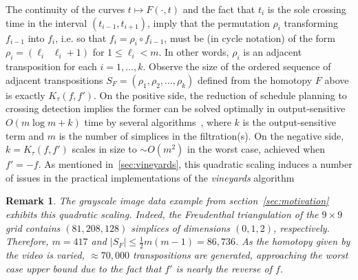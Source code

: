 \documentclass[sn-mathphys]{sn-jnl}
\newtheorem{remark}{Remark}
\begin{document}
The continuity of the curves $t\mapsto F(\cdot, t)$ and the fact that $t_i$ is the sole crossing time  in the interval $(t_{i-1}, t_{i+1})$, imply that the
permutation $\rho_i $   
transforming $f_{i-1}$ into $f_i$, i.e. so that  $f_i = \rho_i \circ f_{i-1}$, must be (in cycle notation) of the form 
$\rho_i = (\ell_i \;\; \ell_i +1 )$ for $1 \leq \ell_i < m$. In other words, $\rho_i$ is an adjacent transposition for each $i =1,\ldots, k$.
Observe the size of the ordered sequence of adjacent transpositions  $S_F = (\rho_1, \rho_2, \ldots, \rho_k)$ defined from the homotopy $F$ above is exactly $K_\tau(f,f')$.
On the positive side, the reduction of schedule planning to crossing detection implies the former can be   solved optimally in output-sensitive $O(m \log m + k)$ time by several algorithms~\cite{boissonnat2000efficient}, where $k$ is the output-sensitive term and $m$ is the number of simplices in the filtration(s).
On  the negative side, $k = K_\tau(f,f')$ scales in size to $\sim O(m^2)$ in the worst case, achieved when $f' = - f$. As mentioned in~\ref{sec:vineyards}, this quadratic scaling induces a number of issues in the practical implementations of the \emph{vineyards} algorithm

\begin{remark}
	The grayscale image data example from section~\ref{sec:motivation} exhibits this quadratic scaling.
Indeed, the Freudenthal triangulation of the $9\times 9$ grid contains $(81, 208, 128)$ simplices of dimensions $(0, 1, 2)$, respectively. 
Therefore, $m = 417$ and $\lvert S_F \rvert \leq \frac{1}{2}m(m-1) = 86,736$.
As the homotopy given by the video is varied,  $\approx 70,\!000$ transpositions are generated, approaching the worst case upper bound due to the fact that $f'$  is nearly the reverse of $f$.  
\end{remark}
\end{document}
